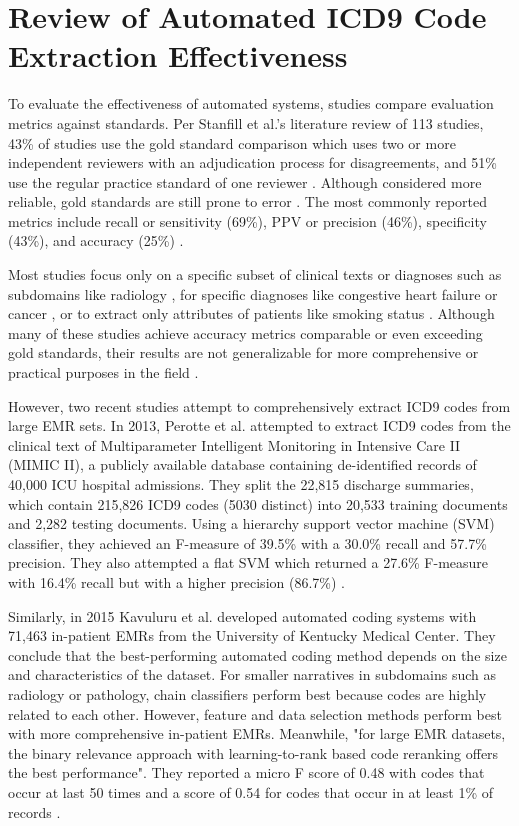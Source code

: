 \documentclass[sigconf]{acmart}
\begin{document}
\section{Review of Automated ICD9 Code Extraction Effectiveness }
To evaluate the effectiveness of automated systems, studies compare evaluation metrics against standards. Per Stanfill et al.'s literature review of 113 studies, 43\% of studies use the gold standard comparison which uses two or more independent reviewers with an adjudication process for disagreements, and 51\% use the regular practice standard of one reviewer \cite{stanfill2010systematic}. Although considered more reliable, gold standards are still prone to error \cite{perotte2013diagnosis}. The most commonly reported metrics include recall or sensitivity (69\%), PPV or precision (46\%), specificity (43\%), and accuracy (25\%) \cite{stanfill2010systematic}.

Most studies focus only on a specific subset of clinical texts or diagnoses such as subdomains like radiology \cite{pons2016natural}, for specific diagnoses like congestive heart failure \cite{friedlin2006natural} or cancer \cite{mamlin2003automated}, or to extract only attributes of patients like smoking status \cite{uzuner2008identifying}. Although many of these studies achieve accuracy metrics comparable or even exceeding gold standards, their results are not generalizable for more comprehensive or practical purposes in the field \cite{stanfill2010systematic}.

However, two recent studies attempt to comprehensively extract ICD9 codes from large EMR sets. In 2013, Perotte et al. attempted to extract ICD9 codes from the clinical text of Multiparameter Intelligent Monitoring in Intensive Care II (MIMIC II), a publicly available database containing de-identified records of 40,000 ICU hospital admissions. They split the 22,815 discharge summaries, which contain 215,826 ICD9 codes (5030 distinct) into 20,533 training documents and 2,282 testing documents. Using a hierarchy support vector machine (SVM) classifier, they achieved an F-measure of 39.5\% with a 30.0\% recall and 57.7\% precision. They also attempted a flat SVM which returned a 27.6\% F-measure with 16.4\% recall but with a higher precision (86.7\%) \cite{perotte2013diagnosis}.

Similarly, in 2015 Kavuluru et al. developed automated coding systems with 71,463 in-patient EMRs from the University of Kentucky Medical Center. They conclude that the best-performing automated coding method depends on the size and characteristics of the dataset. For smaller narratives in subdomains such as radiology or pathology, chain classifiers perform best because codes are highly related to each other. However, feature and data selection methods perform best with more comprehensive in-patient EMRs. Meanwhile, "for large EMR datasets, the binary relevance approach with learning-to-rank based code reranking offers the best performance". They reported a micro F score of 0.48 with codes that occur at last 50 times and a score of 0.54 for codes that occur in at least 1\% of records \cite{kavuluru2015empirical}.
\end{document}

